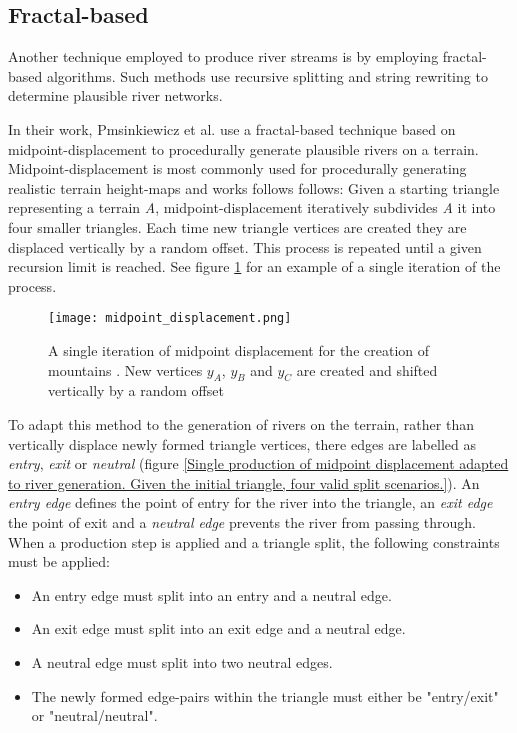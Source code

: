 \subsection{Fractal-based}

Another technique employed to produce river streams is by employing fractal-based algorithms. Such methods use recursive splitting and string rewriting to determine plausible river networks. 

In their work, Pmsinkiewicz et al. use a fractal-based technique based on midpoint-displacement to procedurally generate plausible rivers on a terrain. Midpoint-displacement is most commonly used for procedurally generating realistic terrain height-maps and works follows follows: Given a starting triangle representing a terrain \textit{A}, midpoint-displacement iteratively subdivides \textit{A} it into four smaller triangles. Each time new triangle vertices are created they are displaced vertically by a random offset. This process is repeated until a given recursion limit is reached. See figure \ref{Midpoint displacement} for an example of a single iteration of the process.

\begin{figure}[h]
  \centering
	\label{Midpoint displacement}
	\texttt{[image: midpoint\_displacement.png]}
	\caption{A single iteration of midpoint displacement for the creation of mountains \cite{Prusinkiewicz1993}. New vertices $y_{A}$, $y_{B}$ and $y_{C}$ are created and shifted vertically by a random offset}
\end{figure}

To adapt this method to the generation of rivers on the terrain, rather than vertically displace newly formed triangle vertices, there edges are labelled as \textit{entry}, \textit{exit} or \textit{neutral} (figure \ref{Single production of midpoint displacement adapted to river generation. Given the initial triangle, four valid split scenarios.}). An \textit{entry edge} defines the point of entry for the river into the triangle, an \textit{exit edge} the point of exit and a \textit{neutral edge} prevents the river from passing through. \\

When a production step is applied and a triangle split, the following constraints must be applied:
\begin{itemize}
\item An entry edge must split into an entry and a neutral edge.
\item An exit edge must split into an exit edge and a neutral edge.
\item A neutral edge must split into two neutral edges.
\item The newly formed edge-pairs within the triangle must either be "entry/exit" or "neutral/neutral".
\end{itemize}

